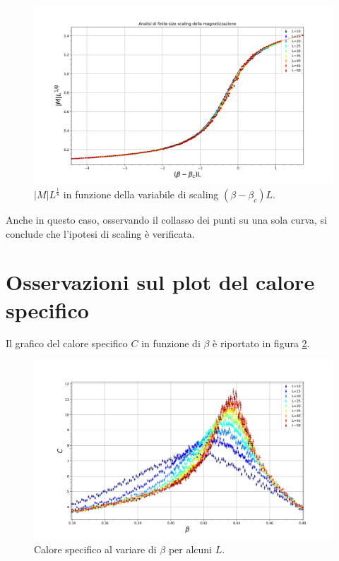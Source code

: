 \documentclass[10pt,a4paper]{article}
\begin{document}
\begin{figure}[h!]%
	\centering
	\includegraphics[width=1\linewidth]{magnass_norm}
	\caption{$|M|L^{\frac{1}{8}}$ in funzione della variabile di scaling $(\beta-\beta_c)L$.}
	\label{fig:magnFSS}
\end{figure}
Anche in questo caso, osservando il collasso dei punti su una sola curva, si conclude che l'ipotesi di scaling è verificata.

\newpage
\section{Osservazioni sul plot del calore specifico}
Il grafico del calore specifico $C$ in funzione di $\beta$ è riportato in figura \ref{fig:calspec}. 

\begin{figure}[h!] 
	\centering
	\includegraphics[width=1\linewidth]{calspec}
	\caption{Calore specifico al variare di $\beta$ per alcuni $L$.}
	\label{fig:calspec}
\end{figure}
\end{document}

